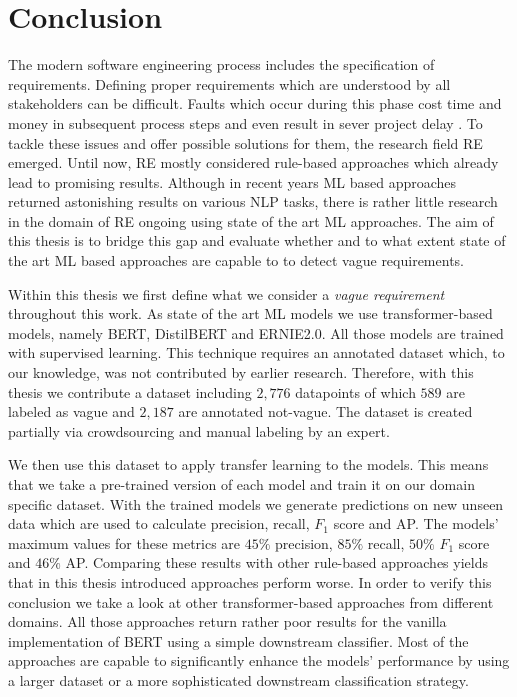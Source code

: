 \chapter{Conclusion}
\label{chp:conclusion}
The modern software engineering process includes the specification of requirements.
Defining proper requirements which are understood by all stakeholders can be difficult.
Faults which occur during this phase cost time and money in subsequent process steps \parencite{Mendez:2016} and even result in sever project delay \parencite{Femmer:2014}.
To tackle these issues and offer possible solutions for them, the research field \ac{RE} emerged.
Until now, \ac{RE} mostly considered rule-based approaches which already lead to promising results.
Although in recent years \ac{ML} based approaches returned astonishing results on various \ac{NLP} tasks, there is rather little research in the domain of \ac{RE} ongoing using state of the art \ac{ML} approaches.
The aim of this thesis is to bridge this gap and evaluate whether and to what extent state of the art \ac{ML} based approaches are capable to to detect vague requirements.

Within this thesis we first define what we consider a \textit{vague requirement} throughout this work.
As state of the art \ac{ML} models we use transformer-based models, namely \ac{BERT}, \ac{DistilBERT} and \ac{ERNIE2.0}.
All those models are trained with supervised learning.
This technique requires an annotated dataset which, to our knowledge, was not contributed by earlier research.
Therefore, with this thesis we contribute a dataset including $2,776$ datapoints of which $589$ are labeled as vague and $2,187$ are annotated not-vague.
The dataset is created partially via crowdsourcing and manual labeling by an expert.

We then use this dataset to apply transfer learning to the models.
This means that we take a pre-trained version of each model and train it on our domain specific dataset.
With the trained models we generate predictions on new unseen data which are used to calculate precision, recall, $F_1$ score and \ac{AP}.
The models' maximum values for these metrics are $45\%$ precision, $85\%$ recall, $50\%$ $F_1$ score and $46\%$ \ac{AP}.
Comparing these results with other rule-based approaches yields that in this thesis introduced approaches perform worse.
In order to verify this conclusion we take a look at other transformer-based approaches from different domains.
All those approaches return rather poor results for the vanilla implementation of \ac{BERT} using a simple downstream classifier.
Most of the approaches are capable to significantly enhance the models' performance by using a larger dataset or a more sophisticated downstream classification strategy.

